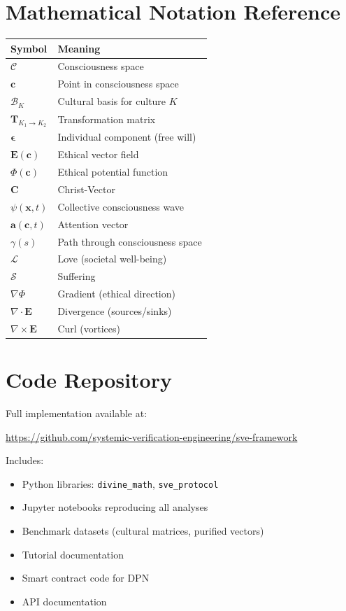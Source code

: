 \documentclass[11pt,a4paper]{article}
\theoremstyle{definition}
\theoremstyle{remark}
\newcommand{\CC}{\mathcal{C}}
\newcommand{\EE}{\mathbf{E}}
\newcommand{\cc}{\mathbf{c}}
\newcommand{\TT}{\mathbf{T}}
\begin{document}
\begin{small}
\section{Mathematical Notation Reference}

\begin{table}[h]
\centering
\begin{tabular}{|l|l|}
\hline
\textbf{Symbol} & \textbf{Meaning} \\
\hline
$\CC$ & Consciousness space \\
$\cc$ & Point in consciousness space \\
$\mathcal{B}_K$ & Cultural basis for culture $K$ \\
$\TT_{K_1 \to K_2}$ & Transformation matrix \\
$\boldsymbol{\epsilon}$ & Individual component (free will) \\
$\EE(\cc)$ & Ethical vector field \\
$\Phi(\cc)$ & Ethical potential function \\
$\mathbf{C}$ & Christ-Vector \\
$\psi(\mathbf{x}, t)$ & Collective consciousness wave \\
$\mathbf{a}(\cc, t)$ & Attention vector \\
$\gamma(s)$ & Path through consciousness space \\
$\mathcal{L}$ & Love (societal well-being) \\
$\mathcal{S}$ & Suffering \\
$\nabla \Phi$ & Gradient (ethical direction) \\
$\nabla \cdot \EE$ & Divergence (sources/sinks) \\
$\nabla \times \EE$ & Curl (vortices) \\
\hline
\end{tabular}
\end{table}

\section{Code Repository}

Full implementation available at:

\begin{center}
\url{https://github.com/systemic-verification-engineering/sve-framework}
\end{center}

Includes:
\begin{itemize}
\item Python libraries: \texttt{divine\_math}, \texttt{sve\_protocol}
\item Jupyter notebooks reproducing all analyses
\item Benchmark datasets (cultural matrices, purified vectors)
\item Tutorial documentation
\item Smart contract code for DPN
\item API documentation
\end{itemize}


\end{small}
\end{document}
